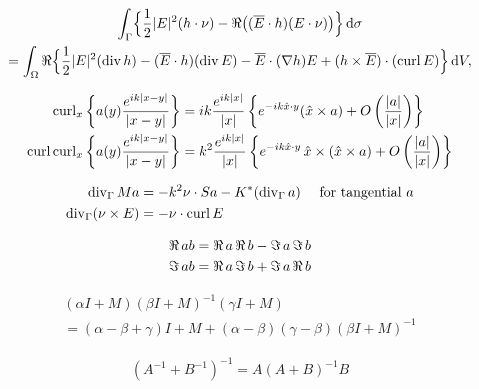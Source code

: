 \begin{multline*}
  \int_{\Gamma}\Bigl\{\frac{1}{2}|E|^2 (h\cdot\nu)-\operatorname{\Re}\bigl((\overline{E}\cdot h)
  (E\cdot\nu)\bigr)\Bigr\}\,\text{d}\sigma\\
  =\int_{\Omega}\operatorname{\Re}\Bigl\{\frac{1}{2}|E|^2(\operatorname{div} h)-(\overline{E}\cdot h)(\operatorname{div} E)
  -\overline{E}\cdot(\nabla h)E+(h\times\overline{E})\cdot(\operatorname{curl} E)\Bigr\}\,\text{d}V,
  \label{eq:Rellich}
\end{multline*}

\begin{align*}
  \operatorname{curl}_x \left\{a(y)\frac{e^{ik|x-y|}}{|x-y|}\right\} &= ik\frac{e^{ik|x|}}{|x|}\left\{e^{-ik\hat{x}\cdot y}(\hat{x}\times a) + O\left(\frac{|a|}{|x|}\right)\right\} \\
  \operatorname{curl}\operatorname{curl}_x \left\{a(y)\frac{e^{ik|x-y|}}{|x-y|}\right\} &= k^2\frac{e^{ik|x|}}{|x|}\left\{e^{-ik\hat{x}\cdot y}\,\hat{x}\times(\hat{x}\times a) + O\left(\frac{|a|}{|x|}\right)\right\} 
\end{align*}

\begin{align*}
  \operatorname{div}_\Gamma{Ma} &= -k^2\nu\cdot Sa-K^*(\operatorname{div}_\Gamma a)\quad\text{ for tangential $a$} \\
  \operatorname{div}_\Gamma(\nu\times E) &= -\nu\cdot\operatorname{curl} E
\end{align*}

\begin{align*}
  \operatorname{\Re}{ab} &= \operatorname{\Re}{a}\operatorname{\Re}{b} - \operatorname{\Im}{a}\operatorname{\Im}{b} \\
  \operatorname{\Im}{ab} &= \operatorname{\Re}{a}\operatorname{\Im}{b} + \operatorname{\Im}{a}\operatorname{\Re}{b} 
\end{align*}

\begin{multline*}
  (\alpha I + M)(\beta I + M)^{-1}(\gamma I + M) \\= (\alpha - \beta + \gamma)I + M + (\alpha - \beta)(\gamma - \beta)(\beta I + M)^{-1}
\end{multline*}

\begin{align*}
  (A^{-1}+B^{-1})^{-1} = A(A+B)^{-1}B
\end{align*}

